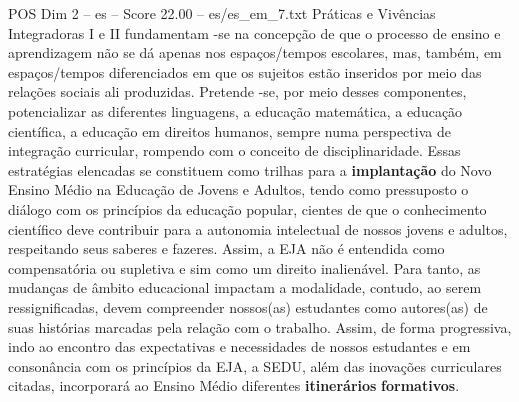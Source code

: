 \begin{textsample}{POS Dim 2 – es – Score 22.00 – es/es\_em\_7.txt}
Práticas e Vivências Integradoras I e II fundamentam -se na concepção de que o processo de ensino e aprendizagem não se dá apenas nos espaços/tempos escolares, mas, também, em espaços/tempos diferenciados em que os sujeitos estão inseridos por meio das relações sociais ali produzidas.
Pretende -se, por meio desses componentes, potencializar as diferentes linguagens, a educação matemática, a educação científica, a educação em direitos humanos, sempre numa perspectiva de integração curricular, rompendo com o conceito de disciplinaridade.
Essas estratégias elencadas se constituem como trilhas para a \textbf{implantação} do Novo Ensino Médio na Educação de Jovens e Adultos, tendo como pressuposto o diálogo com os princípios da educação popular, cientes de que o conhecimento científico deve contribuir para a autonomia intelectual de nossos jovens e adultos, respeitando seus saberes e fazeres.
Assim, a EJA não é entendida como compensatória ou supletiva e sim como um direito inalienável.
Para tanto, as mudanças de âmbito educacional impactam a modalidade, contudo, ao serem ressignificadas, devem compreender nossos(as) estudantes como autores(as) de suas histórias marcadas pela relação com o trabalho.
Assim, de forma progressiva, indo ao encontro das expectativas e necessidades de nossos estudantes e em consonância com os princípios da EJA, a SEDU, além das inovações curriculares citadas, incorporará ao Ensino Médio diferentes \textbf{itinerários} \textbf{formativos}.

\end{textsample}
